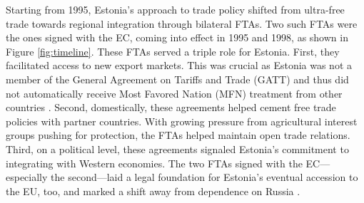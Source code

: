 \documentclass[a4paper,10pt]{article}
\begin{document}
Starting from 1995, Estonia's approach to trade policy shifted from ultra-free trade towards regional integration through bilateral FTAs. Two such FTAs were the ones signed with the EC, coming into effect in 1995 and 1998, as shown in Figure \ref{fig:timeline}. These FTAs served a triple role for Estonia. First, they facilitated access to new export markets. This was crucial as Estonia was not a member of the General Agreement on Tariffs and Trade (GATT) and thus did not automatically receive Most Favored Nation (MFN) treatment from other countries \citep{feldmann_soviet_2002}. Second, domestically, these agreements helped cement free trade policies with partner countries. With growing pressure from agricultural interest groups pushing for protection, the FTAs helped maintain open trade relations. Third, on a political level, these agreements signaled Estonia's commitment to integrating with Western economies. The two FTAs signed with the EC---especially the second---laid a legal foundation for Estonia's eventual accession to the EU, too, and marked a shift away from dependence on Russia \citep{pisuke_estonia_1996}.
\end{document}
